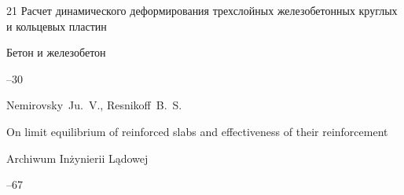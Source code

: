 \begin{thebibliography}{21}
\paper Расчет динамического деформирования трехслойных железобетонных круглых и кольцевых пластин

\jour Бетон и железобетон



--30




















\pagebreak




\by Nemirovsky~Ju.~V., Resnikoff~B.~S.

\paper On limit equilibrium of reinforced slabs and effectiveness of their reinforcement

\jour Archiwum In\.zynierii L\k{a}dowej




--67



\end{thebibliography}



\renewcommand{\baselinestretch}{0.9}



\RuDate



\bigskip



